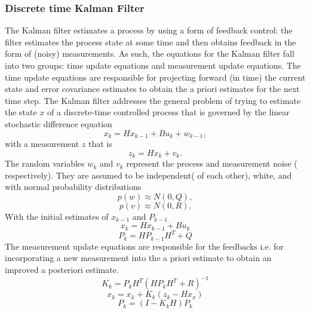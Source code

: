 \documentclass[a4paper,10pt]{report}
\begin{document}
\subsubsection{Discrete time Kalman Filter}
The Kalman filter estimates a process by using a form of feedback control: the filter estimates the process state at some time and
then obtains feedback in the form of (noisy) measurements. As such, the equations for the Kalman filter fall into two groups: time
update equations and measurement update equations. The time update equations are responsible for projecting forward (in time) the
current state and error covariance estimates to obtain the a priori estimates for the next time step.
\newline
The Kalman filter addresses the general problem of trying to estimate the state $x$ of a discrete-time controlled process that is
governed by the linear stochastic difference equation 
\begin{equation}
 x_k = Hx_{k-1} + Bu_k + w_{k-1} ,
\end{equation}
with a measurement $z$ that is
\begin{equation}
 z_k = Hx_k + v_k.
\end{equation}
The random variables $w_k$ and $v_k$ represent the process and measurement noise ( respectively). They are assumed to be independent( of each other), white, and with normal probability distributions
\begin{equation}
 p(w) \approx N(0,Q),
\end{equation}
\begin{equation}
 p(v) \approx N(0,R).
\end{equation}
With the initial estimates of $x_{k-1}$ and $P_{k-1}$
\begin{equation}
x_k = Hx_{k-1} + Bu_k
\end{equation}
\begin{equation}
P_k = HP_{k-1}H^T + Q
\end{equation}
The measurement update equations are responsible for the feedbacks i.e. for incorporating a new measurement into the a priori estimate
to obtain an improved a posteriori estimate.
\begin{equation}
K_k = P_kH^T(HP_kH^T + R)^{-1} \label{kalmangain}
\end{equation}
\begin{equation}
x_k = x_k + K_k(z_k - Hx_x)
\end{equation}
\begin{equation}
P_k = (I-K_kH)P_k
\end{equation}
\end{document}
